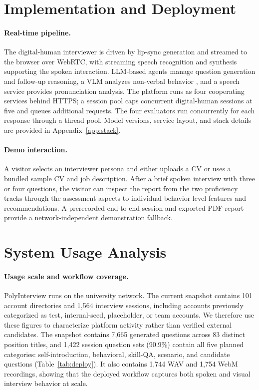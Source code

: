 \documentclass[11pt]{article}
\begin{document}
\section{Implementation and Deployment}
\label{sec:impl}

\paragraph{Real-time pipeline.} The digital-human interviewer is driven by lip-sync generation \citep{prajwal2020wav2lip} and streamed to the browser over WebRTC, with streaming speech recognition and synthesis supporting the spoken interaction. LLM-based agents manage question generation and follow-up reasoning, a VLM analyzes non-verbal behavior \citep{bai2023qwenvl}, and a speech service provides pronunciation analysis. The platform runs as four cooperating services behind HTTPS; a session pool caps concurrent digital-human sessions at five and queues additional requests. The four evaluators run concurrently for each response through a thread pool. Model versions, service layout, and stack details are provided in Appendix~\ref{app:stack}.

\paragraph{Demo interaction.} A visitor selects an interviewer persona and either uploads a CV or uses a bundled sample CV and job description. After a brief spoken interview with three or four questions, the visitor can inspect the report from the two proficiency tracks through the assessment aspects to individual behavior-level features and recommendations. A prerecorded end-to-end session and exported PDF report provide a network-independent demonstration fallback.

\section{System Usage Analysis}
\label{sec:deploy}



\paragraph{Usage scale and workflow coverage.} PolyInterview runs on the university network. The current snapshot contains 101 account directories and 1{,}564 interview sessions, including accounts previously categorized as test, internal-seed, placeholder, or team accounts. We therefore use these figures to characterize platform activity rather than verified external candidates. The snapshot contains 7{,}665 generated questions across 83 distinct position titles, and 1{,}422 session question sets (90.9\%) contain all five planned categories: self-introduction, behavioral, skill-QA, scenario, and candidate questions (Table~\ref{tab:deploy}). It also contains 1{,}744 WAV and 1{,}754 WebM recordings, showing that the deployed workflow captures both spoken and visual interview behavior at scale.
\end{document}
